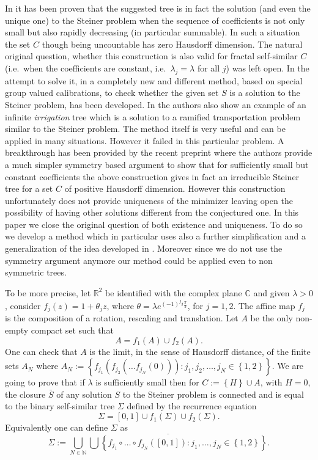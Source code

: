 \documentclass{amsart}
\newcommand{\RR}{\mathbb R}
\newcommand{\CC}{\mathbb C}
\newcommand{\NN}{\mathbb N}
\newcommand{\ENCLOSE}[1]{\left\{#1\right\}}
\theoremstyle{definition}
\theoremstyle{remark}
\begin{document}
In \cite{PaoSteTep15} it has been proven that 
the suggested tree is in fact the solution (and even the unique one) 
to the Steiner problem when the sequence of coefficients 
is not only small but also rapidly decreasing (in particular summable).
In such a situation the set $C$ though being uncountable 
has zero Hausdorff dimension.
The natural original question, whether this construction is also valid 
for fractal self-similar $C$ (i.e.\ when the coefficients are constant,
i.e.\ $\lambda_j=\lambda$ for all $j$)
was left open.
In the attempt to solve it, in \cite{MarMas16a} a 
completely new and different method, based on special group valued calibrations,
to check whether the given set $S$ is a solution to the Steiner problem,
has been developed.
In \cite{MarMas16b} the authors also show an example 
of an infinite \emph{irrigation} tree which is a solution to
a ramified transportation problem similar to the Steiner problem.
The method itself is very useful and can be applied in many situations.
However it failed in this particular problem.
A breakthrough has been provided by the recent preprint \cite{CheTep23}
where the authors provide a much simpler symmetry based argument to show that for 
sufficiently small but constant coefficients the above construction 
gives in fact an irreducible Steiner tree for a set $C$ 
of positive Hausdorff dimension.
However this construction unfortunately does not provide uniqueness of 
the minimizer leaving open the possibility of having other solutions 
different from the conjectured one.
In this paper 
we close the original question of both existence and uniqueness.
To do so we develop a method which in particular uses 
also a further simplification and a generalization of 
the idea developed in \cite{CheTep23}.
Moreover since we do not use the symmetry argument anymore our method 
could be applied even to non symmetric trees.

To be more precise, 
let $\RR^2$ be identified with the complex plane $\CC$
and given $\lambda>0$, 
consider $f_j(z) = 1 + \theta_j z$,
where $\theta = \lambda e^{(-1)^j i \frac \pi 3}$,
for $j=1,2$. 
The affine map $f_j$ is the composition of a rotation,
rescaling and translation. 
Let $A$ be the only non-empty compact set such that 
\[
  A = f_1(A) \cup f_2(A).  
\]
One can check that $A$ is the limit, 
in the sense of Hausdorff distance,
of the finite sets $A_N$ where $A_N:=\ENCLOSE{f_{j_1}(f_{j_2}(\dots f_{j_N}(0)))\colon 
j_1,j_2, \dots, j_N \in \ENCLOSE{1,2}}$.
We are going to prove that if $\lambda$ is sufficiently 
small then 
for $C:=\ENCLOSE{H}\cup A$, with $H=0$, the closure $\bar S$ of any solution 
$S$ to the Steiner problem 
is connected and is equal to the binary self-similar 
tree $\Sigma$ defined by the recurrence equation
\[
  \Sigma = [0,1] \cup f_1(\Sigma) \cup f_2(\Sigma).
\]
Equivalently one can define $\Sigma$ as
\[
  \Sigma := \overline{\bigcup_{N \in \NN}  
  \bigcup\ENCLOSE{f_{j_1}\circ \dots \circ f_{j_N}([0,1])\colon 
  j_1, \dots, j_N \in \ENCLOSE{1,2}}}.
\]
\end{document}
